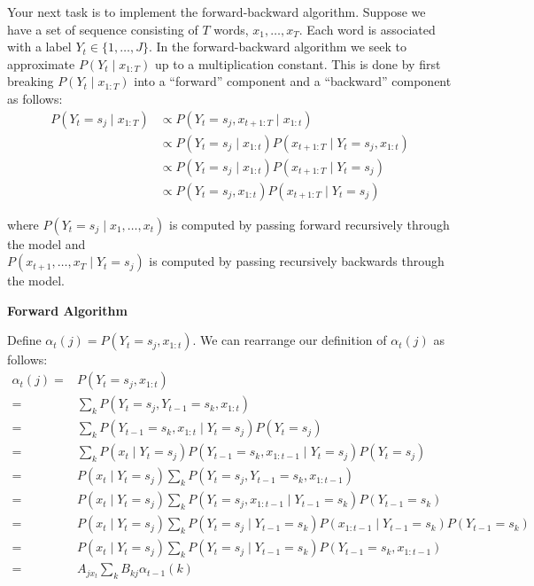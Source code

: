 \documentclass[11pt,addpoints,answers]{exam}
\begin{document}
Your next task is to implement the forward-backward algorithm. Suppose we have a set of sequence consisting of $T$ words, $x_1,\dots,x_T$. Each word is associated with a label $Y_t\in\{1,\dots,J\}$. In the forward-backward algorithm we seek to approximate $P(Y_t \mid x_{1:T})$ up to a multiplication constant. This is done by first breaking $P(Y_t \mid x_{1:T})$ into a ``forward'' component and a ``backward'' component as follows:
\begin{align*}
   P(Y_t =s_j \mid x_{1:T}) &\propto P(Y_t=s_j,x_{t+1:T} \mid x_{1:t})\\
   &\propto P(Y_t=s_j \mid x_{1:t})P(x_{t+1:T} \mid Y_t=s_j, x_{1:t})\\
    &\propto P(Y_t=s_j \mid x_{1:t})P(x_{t+1:T} \mid Y_t=s_j)\\ 
     &\propto P(Y_t=s_j, x_{1:t})P(x_{t+1:T} \mid Y_t=s_j) 
\end{align*}



where $P(Y_t=s_j \mid x_1,\dots,x_{t})$ is computed by passing forward recursively through the model and\\ $P(x_{t+1},\dots,x_T \mid Y_t=s_j)$ is computed by passing recursively backwards through the model.

\vspace{0.4 in}
\textbf{Forward Algorithm}



Define $\alpha_t(j) = P(Y_t = s_j, x_{1:t})$. We can rearrange our definition of $\alpha_t(j)$ as follows:
\begin{align}
    \label{eqn:alpha}
    \alpha_t(j)
    =&P(Y_t=s_j, x_{1:t}) \nonumber\\
    =& \sum_{k} P(Y_t=s_j, Y_{t-1}=s_k, x_{1:t}) \nonumber\\
    =& \sum_{k} P(Y_{t-1}=s_k, x_{1:t} \mid Y_t = s_j) P(Y_t = s_j) \nonumber\\
    =& \sum_{k} P(x_t \mid Y_t = s_j) P(Y_{t-1}=s_k, x_{1:t-1} \mid Y_t = s_j) P(Y_t = s_j) \nonumber\\
    =& P(x_t \mid Y_t = s_j) \sum_{k} P(Y_t = s_j, Y_{t-1}=s_k, x_{1:t-1}) \nonumber\\
    =& P(x_t \mid Y_t = s_j) \sum_{k} P(Y_t = s_j, x_{1:t-1} \mid Y_{t-1}=s_k) P(Y_{t-1}=s_k) \nonumber\\
    =& P(x_t \mid Y_t = s_j) \sum_{k} P(Y_t = s_j \mid Y_{t-1}=s_k) P(x_{1:t-1} \mid Y_{t-1}=s_k) P(Y_{t-1}=s_k) \nonumber\\
    =& P(x_t \mid Y_t = s_j) \sum_{k} P(Y_t = s_j \mid Y_{t-1}=s_k) P(Y_{t-1}=s_k, x_{1:t-1}) \nonumber\\
    =& A_{jx_t} \sum_{k} B_{kj} \alpha_{t-1}(k)
\end{align}
\end{document}
